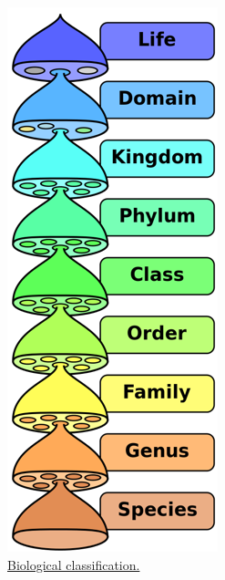 \begin{figure}

{\centering \includegraphics[width=0.7\linewidth]{./figures/appendix1/biological_classification}

}

\caption{\href{https://commons.wikimedia.org/wiki/File:Biological_classification_L_Pengo_vflip.svg}{Biological
classification.}}\label{fig:classification}
\end{figure}

